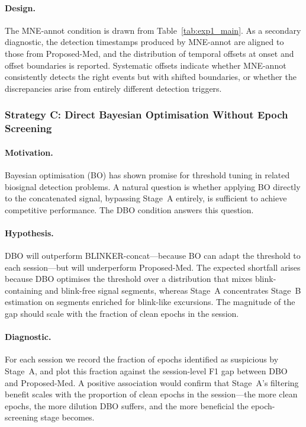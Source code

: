 \paragraph{Design.}
The MNE-annot condition is drawn from Table~\ref{tab:exp1_main}.
As a secondary diagnostic, the detection timestamps produced by MNE-annot
are aligned to those from Proposed-Med, and the distribution of temporal
offsets at onset and offset boundaries is reported.
Systematic offsets indicate whether MNE-annot consistently detects the right
events but with shifted boundaries, or whether the discrepancies arise from
entirely different detection triggers.

\subsubsection{Strategy C: Direct Bayesian Optimisation Without Epoch Screening}
\label{sec:exp2}

\paragraph{Motivation.}
Bayesian optimisation (BO) has shown promise for threshold tuning in related
biosignal detection problems.
A natural question is whether applying BO directly to the concatenated signal,
bypassing Stage~A entirely, is sufficient to achieve competitive performance.
The DBO condition answers this question.

\paragraph{Hypothesis.}
DBO will outperform BLINKER-concat---because BO can adapt the threshold
to each session---but will underperform Proposed-Med.
The expected shortfall arises because DBO optimises the threshold over a
distribution that mixes blink-containing and blink-free signal segments, whereas
Stage~A concentrates Stage~B estimation on segments enriched for blink-like
excursions.
The magnitude of the gap should scale with the fraction of clean epochs in the
session.

\paragraph{Diagnostic.}
For each session we record the fraction of epochs identified as suspicious
by Stage~A, and plot this fraction against the session-level F1 gap between DBO
and Proposed-Med.
A positive association would confirm that Stage~A's filtering benefit scales
with the proportion of clean epochs in the session---the more clean epochs,
the more dilution DBO suffers, and the more beneficial the epoch-screening
stage becomes.
